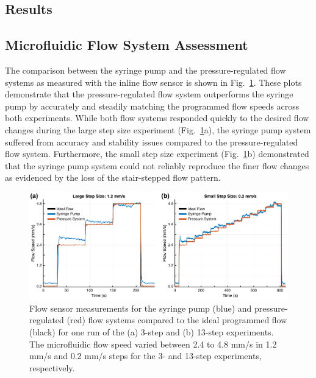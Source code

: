 \documentclass[12pt]{spieman}
\begin{document}
\begin{spacing}{2}
\section{Results}
\label{sect:results}

\subsection{Microfluidic Flow System Assessment}
\label{sect:results_flow_assess}

The comparison between the syringe pump and the pressure-regulated flow systems as measured with the inline flow sensor is shown in Fig.~\ref{fig:SvP-FS}. These plots demonstrate that the pressure-regulated flow system outperforms the syringe pump by accurately and steadily matching the programmed flow speeds across both experiments. While both flow systems responded quickly to the desired flow changes during the large step size experiment (Fig.~\ref{fig:SvP-FS}a), the syringe pump system suffered from accuracy and stability issues compared to the pressure-regulated flow system. Furthermore, the small step size experiment (Fig.~\ref{fig:SvP-FS}b) demonstrated that the syringe pump system could not reliably reproduce the finer flow changes as evidenced by the loss of the stair-stepped flow pattern.

\begin{figure}
    \includegraphics[width=\textwidth]{Figure4.pdf}
    \caption {
        Flow sensor measurements for the syringe pump (blue) and pressure-regulated (red) flow systems compared to the ideal programmed flow (black) for one run of the (a) 3-step and (b) 13-step experiments. The microfluidic flow speed varied between 2.4 to 4.8 mm/s in 1.2 mm/s and 0.2 mm/s steps for the 3- and 13-step experiments, respectively.
    }
    \label{fig:SvP-FS}
\end{figure}


\end{spacing}
\end{document}
